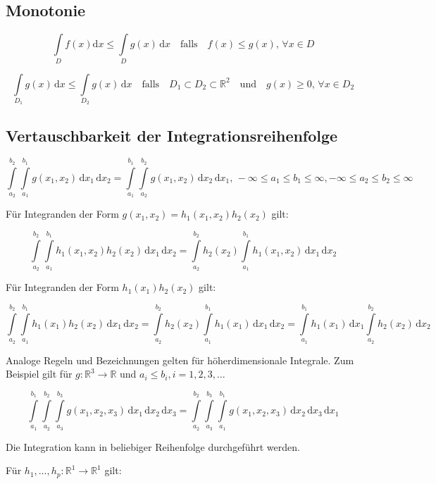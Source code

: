 \documentclass[12pt, a4paper]{article}
\theoremstyle{plain}
\theoremstyle{definition}
\newcommand{\R}{\mathbb{R}}
\newcommand{\1}{\mathds{1}}
\renewcommand{\d}{\,\mathrm{d}}
\providecommand{\mtext}[1]{\quad \text{#1} \quad}
\begin{document}
\subsection{Monotonie}
$$\int\limits_D f(x) \mathrm{d}x \leq \int\limits_D g(x) \d x \quad \text{falls} \quad f(x) \leq g(x), \, \forall x \in D$$

$$ \int\limits_{D_1} g(x) \d x \leq \int\limits_{D_2} g(x) \d x \mtext{falls} D_1 \subset D_2 \subset \R^2 \mtext{und} g(x) \geq 0, \, \forall x \in D_2$$

\subsection{Vertauschbarkeit der Integrationsreihenfolge}

\[\int\limits_{a_2}^{b_2}  \int\limits_{a_1}^{b_1}  g(x_1, x_2) \d x_1 \d x_2   =  \int\limits_{a_1}^{b_1} \int\limits_{a_2}^{b_2} g(x_1, x_2) \d x_2  \d x_1, \, -\infty \leq a_1 \leq b_1 \leq \infty , -\infty \leq a_2 \leq b_2 \leq \infty\]

Für Integranden der Form $g(x_1, x_2) = h_1(x_1, x_2) h_2(x_2)$ gilt:

\[ \int\limits_{a_2}^{b_2} \int\limits_{a_1}^{b_1}  h_1(x_1, x_2) h_2(x_2) \d x_1 \d x_2  = \int\limits_{a_2}^{b_2} h_2(x_2) \int\limits_{a_1}^{b_1} h_1(x_1, x_2) \d x_1 \d x_2 \]

Für Integranden der Form $ h_1(x_1) h_2(x_2) $ gilt:

\[ \int\limits_{a_2}^{b_2} \int\limits_{a_1}^{b_1} h_1(x_1) h_2(x_2) \d x_1 \d x_2 = \int\limits_{a_2}^{b_2} h_2(x_2) \int\limits_{a_1}^{b_1} h_1(x_1) \d x_1 \d x_2 =  \int\limits_{a_1}^{b_1} h_1(x_1) \d x_1 \int\limits_{a_2}^{b_2} h_2(x_2) \d x_2 \]

Analoge Regeln und Bezeichnungen gelten für höherdimensionale Integrale. Zum Beispiel gilt für $g:\R^3 \to \R$ und $a_i \leq b_i, i=1,2,3,\ldots$

\[ \int\limits_{a_1}^{b_1} \int\limits_{a_2}^{b_2} \int\limits_{a_3}^{b_3}  g(x_1, x_2, x_3) \d x_1 \d x_2 \d x_3 =  \int\limits_{a_2}^{b_2}  \int\limits_{a_3}^{b_3} \int\limits_{a_1}^{b_1} 
g(x_1, x_2, x_3) \d x_2 \d x_3 \d x_1\]

Die Integration kann in beliebiger Reihenfolge durchgeführt werden.

Für $ h_1, \ldots, h_p: \R^1 \to \R^1 $ gilt:
\end{document}
